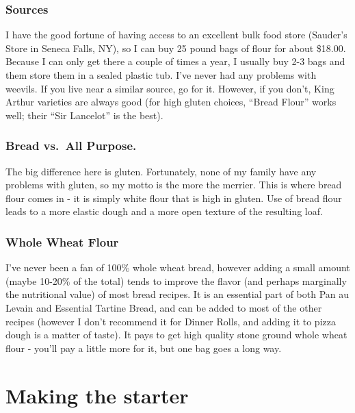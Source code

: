\documentclass[
]{book}
\begin{document}
\hypertarget{sources}{%
\subsubsection{Sources}\label{sources}}

I have the good fortune of having access to an excellent bulk food store (Sauder's Store in Seneca Falls, NY), so I can buy 25 pound bags of flour for about \$18.00. Because I can only get there a couple of times a year, I usually buy 2-3 bags and them store them in a sealed plastic tub. I've never had any problems with weevils. If you live near a similar source, go for it. However, if you don't, King Arthur varieties are always good (for high gluten choices, ``Bread Flour'' works well; their ``Sir Lancelot'' is the best).

\hypertarget{bread-vs.-all-purpose.}{%
\subsubsection{Bread vs.~All Purpose.}\label{bread-vs.-all-purpose.}}

The big difference here is gluten. Fortunately, none of my family have any problems with gluten, so my motto is the more the merrier. This is where bread flour comes in - it is simply white flour that is high in gluten. Use of bread flour leads to a more elastic dough and a more open texture of the resulting loaf.

\hypertarget{whole-wheat-flour}{%
\subsubsection{Whole Wheat Flour}\label{whole-wheat-flour}}

I've never been a fan of 100\% whole wheat bread, however adding a small amount (maybe 10-20\% of the total) tends to improve the flavor (and perhaps marginally the nutritional value) of most bread recipes. It is an essential part of both Pan au Levain and Essential Tartine Bread, and can be added to most of the other recipes (however I don't recommend it for Dinner Rolls, and adding it to pizza dough is a matter of taste). It pays to get high quality stone ground whole wheat flour - you'll pay a little more for it, but one bag goes a long way.

\hypertarget{starter}{%
\section{Making the starter}\label{starter}}
\end{document}
